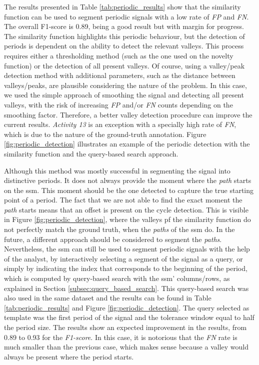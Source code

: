 The results presented in Table \ref{tab:periodic_results} show that the similarity function can be used to segment periodic signals with a low rate of \textit{FP} and \textit{FN}. The overall F1-score is 0.89, being a good result but with margin for progress. The similarity function highlights this periodic behaviour, but the detection of periods is dependent on the ability to detect the relevant valleys. This process requires either a thresholding method (such as the one used on the novelty function) or the detection of all present valleys. Of course, using a valley/peak detection method with additional parameters, such as the distance between valleys/peaks, are plausible considering the nature of the problem. In this case, we used the simple approach of smoothing the signal and detecting all present valleys, with the risk of increasing \textit{FP} and/or \textit{FN} counts depending on the smoothing factor. Therefore, a better valley detection procedure can improve the current results. \textit{Activity 13} is an exception with a specially high rate of \textit{FN}, which is due to the nature of the ground-truth annotation. Figure \ref{fig:periodic_detection} illustrates an example of the periodic detection with the similarity function and the query-based search approach.

Although this method was mostly successful in segmenting the signal into distinctive periods. It does not always provide the moment where the \textit{path} starts on the \gls{ssm}. This moment should be the one detected to capture the true starting point of a period. The fact that we are not able to find the exact moment the \textit{path} starts means that an offset is present on the cycle detection. This is visible in Figure \ref{fig:periodic_detection}, where the valleys pf the similarity function do not perfectly match the ground truth, when the \textit{paths} of the \gls{ssm} do. In the future, a different approach should be considered to segment the \textit{paths}. Nevertheless, the \gls{ssm} can still be used to segment periodic signals with the help of the analyst, by interactively selecting a segment of the signal as a query, or simply by indicating the index that corresponds to the beginning of the period, which is computed by query-based search with the \gls{ssm}' columns/rows, as explained in Section \ref{subsec:query_based_search}. This query-based search was also used in the same dataset and the results can be found in Table \ref{tab:periodic_results} and Figure \ref{fig:periodic_detection}. The query selected as template was the first period of the signal and the tolerance window equal to half the period size. The results show an expected improvement in the results, from 0.89 to 0.93 for the \textit{F1-score}. In this case, it is notorious that the \textit{FN} rate is much smaller than the previous case, which makes sense because a valley would always be present where the  period starts.

